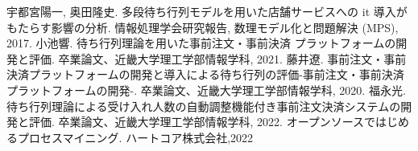 \documentclass{jsarticle}
\begin{document}
\newpage

\begin{thebibliography}{99}
 宇都宮陽一, 奥田隆史. 多段待ち行列モデルを用いた店舗サービスへの it 導入がもたらす影響の分析. 情報処理学会研究報告, 数理モデル化と問題解決 (MPS), 2017.
 小池響. 待ち行列理論を用いた事前注文・事前決済 プラットフォームの開発と評価. 卒業論文、近畿大学理工学部情報学科, 2021.
 藤井遼. 事前注文・事前決済プラットフォームの開発と導入による待ち行列の評価-事前注文・事前決済プラットフォームの開発-. 卒業論文、近畿大学理工学部情報学科, 2020.
 福永光. 待ち行列理論による受け入れ人数の自動調整機能付き事前注文決済システムの開発と評価. 卒業論文、近畿大学理工学部情報学科, 2022.
 オープンソースではじめるプロセスマイニング. ハートコア株式会社,2022
\end{thebibliography}
\end{document}
